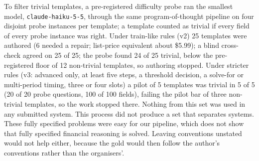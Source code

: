 \documentclass[conference]{IEEEtran}
\newcommand{\id}[1]{\texttt{#1}}
\begin{document}
To filter trivial templates, a pre-registered difficulty probe ran the smallest model, \id{claude-haiku-5-5}, through the same program-of-thought pipeline on four disjoint probe instances per template; a template counted as trivial if every field of every probe instance was right. Under train-like rules (v2) 25 templates were authored (6 needed a repair; list-price equivalent about \$5.99); a blind cross-check agreed on 25 of 25; the probe found 24 of 25 trivial, below the pre-registered floor of 12 non-trivial templates, so authoring stopped. Under stricter rules (v3: advanced only, at least five steps, a threshold decision, a solve-for or multi-period timing, three or four slots) a pilot of 5 templates was trivial in 5 of 5 (20 of 20 probe questions, 100 of 100 fields), failing the pilot bar of three non-trivial templates, so the work stopped there. Nothing from this set was used in any submitted system. This process did not produce a set that separates systems. These fully specified problems were easy for our pipeline, which does not show that fully specified financial reasoning is solved. Leaving conventions unstated would not help either, because the gold would then follow the author's conventions rather than the organisers'.
\end{document}

